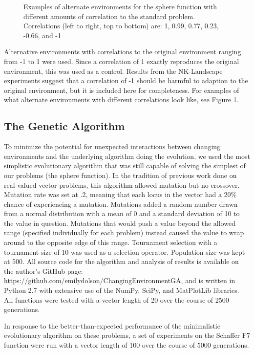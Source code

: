 \documentclass{sig-alternate}
\begin{document}
\begin{figure*}
\centering
{}
\caption{Examples of alternate environments for the sphere function with different amounts of correlation to 
the standard problem. Correlations (left to right, top to bottom) are: 1, 0.99, 0.77, 0.23, -0.66, and -1}
\end{figure*}

Alternative environments with correlations to the original environment ranging from -1 to 1 were used. Since a correlation of 1 exactly reproduces the original environment, this was used as a control. Results from the NK-Landscape experiments suggest that a correlation of -1 should be harmful to adaption to the original environment, but it is included here for completeness. For examples of what alternate environments with different correlations look like, see Figure 1.

\subsection{The Genetic Algorithm}
To minimize the potential for unexpected interactions between changing environments and the underlying algorithm doing the evolution, we used the most simplistic evolutionary algorithm that was still capable of solving the simplest of our problems (the sphere function). In the tradition of previous work done on real-valued vector problems, this algorithm allowed mutation but no crossover. Mutation rate was set at .2, meaning that each locus in the vector had a 20\% chance of experiencing a mutation. Mutations added a random number drawn from a normal distribution with a mean of 0 and a standard deviation of 10 to the value in question. Mutations that would push a value beyond the allowed range (specified individually for each problem) instead caused the value to wrap around to the opposite edge of this range. Tournament selection with a tournament size of 10 was used as a selection operator. Population size was kept at 500. All source code for the algorithm and analysis of results is available on the author's GitHub page: https://github.com/emilydolson/ChangingEnvironmentGA, and is written in Python 2.7 with extensive use of the NumPy, SciPy\cite{jones_scipy:_2001}, and MatPlotLib\cite{hunter_matplotlib:_2007} libraries. All functions were tested with a vector length of 20 over the course of 2500 generations.

In response to the better-than-expected performance of the minimalistic evolutionary algorithm on these problems, a set of experiments on the Schaffer F7 function were run with a vector length of 100 over the course of 5000 generations.
\end{document}
